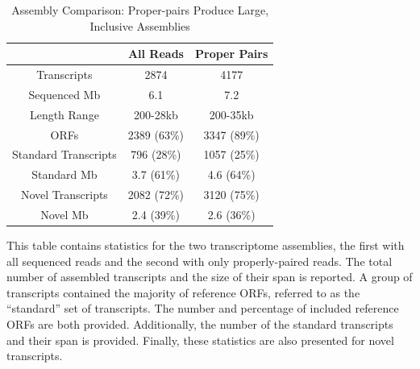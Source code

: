\begin{table}
\begin{center}
\begin{tabular}{|c|c|c|}\hline
  & All Reads & Proper Pairs\\\hline\hline
Transcripts & 2874 & 4177\\\hline
Sequenced Mb & 6.1 & 7.2\\\hline
Length Range & 200-28kb & 200-35kb\\\hline
ORFs & 2389 (63\%) & 3347 (89\%)\\\hline
Standard Transcripts & 796 (28\%) & 1057 (25\%)\\\hline
Standard Mb & 3.7 (61\%) & 4.6 (64\%)\\\hline
Novel Transcripts & 2082 (72\%) & 3120 (75\%)\\\hline
Novel Mb & 2.4 (39\%)& 2.6 (36\%)\\\hline
\end{tabular}
\end{center}
\caption{Assembly Comparison: Proper-pairs Produce Large, Inclusive Assemblies}\label{table:assemb_compare}
\small
This table contains statistics for the two transcriptome assemblies, the first with all sequenced reads and the second with only properly-paired reads. The total number of assembled transcripts and the size of their span is reported. A group of transcripts contained the majority of reference ORFs, referred to as the ``standard'' set of transcripts. The number and percentage of included reference ORFs are both provided. Additionally, the number of the standard transcripts and their span is provided. Finally, these statistics are also presented for novel transcripts.
\end{table}

